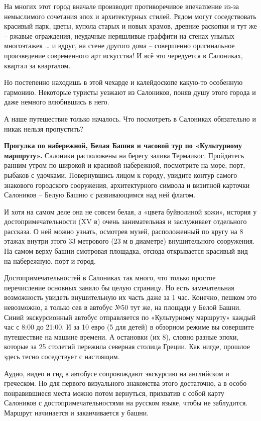 На многих этот город вначале производит противоречивое впечатление из-за немыслимого сочетания эпох и архитектурных стилей. Рядом могут соседствовать красивый парк, цветы, купола старых и новых храмов, древние раскопки и тут же – ржавые ограждения, неудачные неряшливые граффити на стенах унылых многоэтажек … и вдруг, на стене другого дома – совершенно оригинальное произведение современного арт искусства! И всё это чередуется в Салониках, квартал за кварталом.

Но постепенно находишь в этой чехарде и калейдоскопе какую-то особенную гармонию. Некоторые туристы уезжают из Салоников, поняв душу этого города и даже немного влюбившись в него.

А наше путешествие только началось. Что посмотреть в Салониках обязательно и никак нельзя пропустить?

\textbf{Прогулка по набережной, Белая Башня и часовой тур по «Культурному маршруту».}
Салоники расположены на берегу залива Термаикос. Пройдитесь ранним утром по широкой и красивой набережной, посмотрите на море, порт, рыбаков с удочками. Повернувшись лицом к городу, увидите контур самого знакового городского сооружения, архитектурного символа и визитной карточки Салоников – Белую Башню с развивающимся над ней флагом.

И хотя на самом деле она не совсем белая, а «цвета буйволиной кожи», история у достопримечательности (XV в) очень занимательная и заслуживает отдельного рассказа. О ней можно узнать, осмотрев музей, расположенный по кругу на 8 этажах внутри этого 33 метрового (23 м в диаметре) внушительного сооружения. На самом верху башни смотровая площадка, отсюда открывается красивый вид на набережную, порт и город.

Достопримечательностей в Салониках так много, что только простое перечисление основных заняло бы целую страницу. Но есть замечательная возможность увидеть внушительную их часть даже за 1 час. Конечно, пешком это невозможно, а только сев в автобус №50 тут же, на площади у Белой Башни. Синий экскурсионный автобус отправляется по «Культурному маршруту» каждый час с 8:00 до 21:00. И за 10 евро (5 для детей) в обзорном режиме вы совершите путешествие на машине времени. А остановки (их 8), словно разные эпохи, которые за 25 столетий пережила северная столица Греции. Как нигде, прошлое здесь тесно соседствует с настоящим.

Аудио, видео и гид в автобусе сопровождают экскурсию на английском и греческом. Но для первого визуального знакомства этого достаточно, а в особо понравившиеся места можно потом вернуться, прихватив с собой карту Салоников с достопримечательностями на русском языке, чтобы не заблудится. Маршрут начинается и заканчивается у башни.

